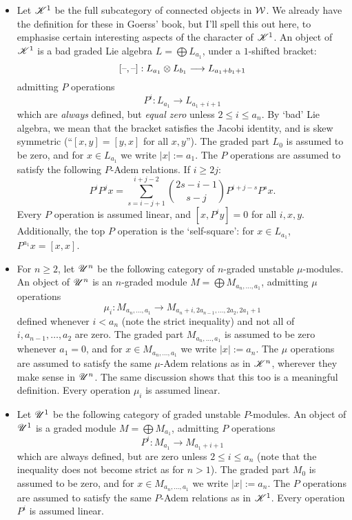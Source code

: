\documentclass[11pt]{article}
\newcommand{\LL}[1]{{\scrK}^{#1}}%
\newcommand{\nontop}[1]{\scrU^{#1}}%
\begin{document}
\begin{itemize}
\item Let $\LL{1}$ be the full subcategory of connected objects in $\mathcal{W}$. We already have the definition for these in Goerss' book, but I'll spell this out here, to emphasise certain interesting aspects of the character of $\LL{1}$.
An object of $\LL{1}$ is a bad graded Lie algebra $L=\bigoplus L_{a_1}$, under a $1$-shifted bracket:
\[[\textup{--},\textup{--}]:L_{a_1}\otimes L_{b_1}\longrightarrow L_{a_1+b_1+1}\]
admitting $P$ operations
\[P^i:L_{a_1}\to L_{a_1+i+1}\]
which are \emph{always} defined, but \emph{equal zero} unless $2\leq i\leq a_n$. By `bad' Lie algebra, we mean that the bracket satisfies the Jacobi identity, and is skew symmetric (``$[x,y]=[y,x]$ for all $x,y$'').
The graded part $L_{0}$ is assumed to be zero, and for $x\in L_{a_1}$ we write $|x|:=a_1$. The $P$ operations are assumed to satisfy the following $P$-Adem relations. If $i\geq 2j$:
\[P^iP^jx=\sum_{s=i-j+1}^{i+j-2}{2s-i-1\choose s-j}P^{i+j-s}P^sx.\]
Every $P$ operation is assumed linear, and $[x,P^iy]=0$ for all $i,x,y$. Additionally, the top $P$ operation is the `self-square': for $x\in L_{a_1}$, $P^{a_1}x=[x,x]$.


\item For $n\geq2$, let $\nontop{n}$ be the following category of $n$-graded unstable $\mu$-modules. An object of $\nontop{n}$ is an $n$-graded module $M=\bigoplus M_{a_n,\ldots,a_1}$,
admitting $\mu$ operations
\[\mu_i:M_{a_n,\ldots,a_1}\to M_{a_n+i,2a_{n-1},\ldots,2a_2,2a_1+1}\]
defined whenever $i< a_n$ (note the strict inequality) and not all of $i,a_{n-1},\ldots,a_{2}$ are zero.
The graded part $M_{a_n,\ldots,a_1}$ is assumed to be zero whenever $a_1=0$, and for $x\in M_{a_n,\ldots,a_1}$ we write $|x|:=a_n$. The $\mu$ operations are assumed to satisfy the same $\mu$-Adem relations as in $\LL{n}$, wherever they make sense in $\nontop{n}$. The same discussion shows that this too is a meaningful definition. Every operation $\mu_i$ is assumed linear.

\item Let $\nontop{1}$ be the following category of graded unstable $P$-modules. An object of $\nontop{1}$ is a graded module $M=\bigoplus M_{a_1}$,
admitting $P$ operations
\[P^i:M_{a_1}\to M_{a_1+i+1}\]
which are always defined, but are zero unless $2\leq i\leq a_n$ (note that the inequality does not become strict as for $n>1$).
The graded part $M_{0}$ is assumed to be zero, and for $x\in M_{a_n,\ldots,a_1}$ we write $|x|:=a_n$. The $P$ operations are assumed to satisfy the same $P$-Adem relations as in $\LL{1}$. Every operation $P^i$ is assumed linear.


\end{itemize}
\end{document}
